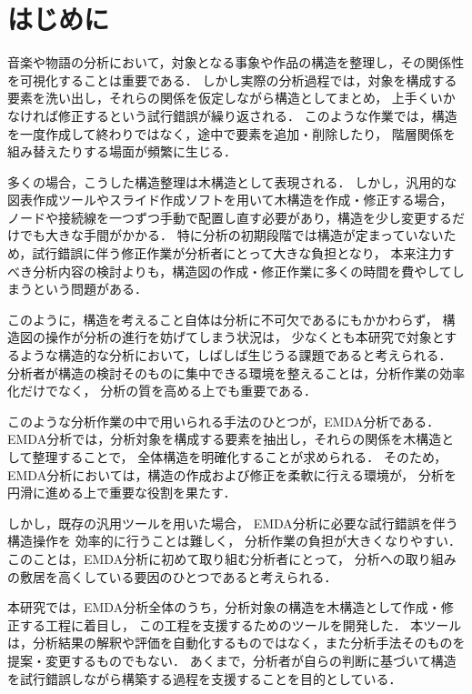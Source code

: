 
\section{はじめに}

音楽や物語の分析において，対象となる事象や作品の構造を整理し，その関係性を可視化することは重要である．
しかし実際の分析過程では，対象を構成する要素を洗い出し，それらの関係を仮定しながら構造としてまとめ，
上手くいかなければ修正するという試行錯誤が繰り返される．
このような作業では，構造を一度作成して終わりではなく，途中で要素を追加・削除したり，
階層関係を組み替えたりする場面が頻繁に生じる．

多くの場合，こうした構造整理は木構造として表現される．
しかし，汎用的な図表作成ツールやスライド作成ソフトを用いて木構造を作成・修正する場合，
ノードや接続線を一つずつ手動で配置し直す必要があり，構造を少し変更するだけでも大きな手間がかかる．
特に分析の初期段階では構造が定まっていないため，試行錯誤に伴う修正作業が分析者にとって大きな負担となり，
本来注力すべき分析内容の検討よりも，構造図の作成・修正作業に多くの時間を費やしてしまうという問題がある．

このように，構造を考えること自体は分析に不可欠であるにもかかわらず，
構造図の操作が分析の進行を妨げてしまう状況は，
少なくとも本研究で対象とするような構造的な分析において，しばしば生じうる課題であると考えられる．
分析者が構造の検討そのものに集中できる環境を整えることは，分析作業の効率化だけでなく，
分析の質を高める上でも重要である．

このような分析作業の中で用いられる手法のひとつが，EMDA分析である\cite{emda2019rigolo, emdahomuratatu, emda3aho}．
EMDA分析では，分析対象を構成する要素を抽出し，それらの関係を木構造として整理することで，
全体構造を明確化することが求められる．
そのため，EMDA分析においては，構造の作成および修正を柔軟に行える環境が，
分析を円滑に進める上で重要な役割を果たす．

しかし，既存の汎用ツールを用いた場合，
EMDA分析に必要な試行錯誤を伴う構造操作を
効率的に行うことは難しく\cite{emdahomuratatu, emda3aho}，
分析作業の負担が大きくなりやすい．
このことは，EMDA分析に初めて取り組む分析者にとって，
分析への取り組みの敷居を高くしている要因のひとつであると考えられる．

本研究では，EMDA分析全体のうち，分析対象の構造を木構造として作成・修正する工程に着目し，
この工程を支援するためのツールを開発した．
本ツールは，分析結果の解釈や評価を自動化するものではなく，また分析手法そのものを提案・変更するものでもない．
あくまで，分析者が自らの判断に基づいて構造を試行錯誤しながら構築する過程を支援することを目的としている．

